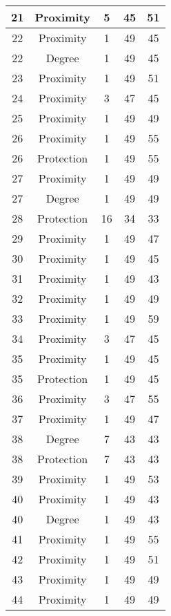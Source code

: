 \documentclass[results.tex]{subfiles}
\begin{document}
\begin{center}
\begin{tabular}{| c || c | c | c | c |}
    \hline
    21 & Proximity & 5 & 45 & 51 \\ 
    \hline
    22 & Proximity & 1 & 49 & 45 \\ 
    \hline
    22 & Degree & 1 & 49 & 45 \\ 
    \hline
    23 & Proximity & 1 & 49 & 51 \\ 
    \hline
    24 & Proximity & 3 & 47 & 45 \\ 
    \hline
    25 & Proximity & 1 & 49 & 49 \\ 
    \hline
    26 & Proximity & 1 & 49 & 55 \\ 
    \hline
    26 & Protection & 1 & 49 & 55 \\ 
    \hline
    27 & Proximity & 1 & 49 & 49 \\ 
    \hline
    27 & Degree & 1 & 49 & 49 \\ 
    \hline
    28 & Protection & 16 & 34 & 33 \\ 
    \hline
    29 & Proximity & 1 & 49 & 47 \\ 
    \hline
    30 & Proximity & 1 & 49 & 45 \\ 
    \hline
    31 & Proximity & 1 & 49 & 43 \\ 
    \hline
    32 & Proximity & 1 & 49 & 49 \\ 
    \hline
    33 & Proximity & 1 & 49 & 59 \\ 
    \hline
    34 & Proximity & 3 & 47 & 45 \\ 
    \hline
    35 & Proximity & 1 & 49 & 45 \\ 
    \hline
    35 & Protection & 1 & 49 & 45 \\ 
    \hline
    36 & Proximity & 3 & 47 & 55 \\ 
    \hline
    37 & Proximity & 1 & 49 & 47 \\ 
    \hline
    38 & Degree & 7 & 43 & 43 \\ 
    \hline
    38 & Protection & 7 & 43 & 43 \\ 
    \hline
    39 & Proximity & 1 & 49 & 53 \\ 
    \hline
    40 & Proximity & 1 & 49 & 43 \\ 
    \hline
    40 & Degree & 1 & 49 & 43 \\ 
    \hline
    41 & Proximity & 1 & 49 & 55 \\ 
    \hline
    42 & Proximity & 1 & 49 & 51 \\ 
    \hline
    43 & Proximity & 1 & 49 & 49 \\ 
    \hline
    44 & Proximity & 1 & 49 & 49 \\ 

\end{tabular}
\end{center}
\end{document}
